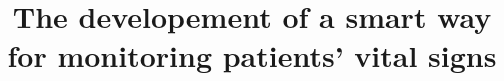 \documentclass{bmcart}
\begin{document}
\begin{frontmatter}

\begin{fmbox}


\title{The developement of a smart way for monitoring patients' vital signs}


\author[ addressref={aff1}, email={michael187107@fci.bu.edu.eg}
   ]{ }

\author[ addressref={aff1}, email={john.RS.Smith@cambridge.co.uk}
]{ }

\author[ addressref={aff1}, email={john.RS.Smith@cambridge.co.uk}
]{ }

\author[ addressref={aff1}, email={john.RS.Smith@cambridge.co.uk}
]{ }


\address[id=aff1]{%
  , %
  ,                     %
  ,                              %
} 


\end{fmbox}
\end{frontmatter}
\end{document}
